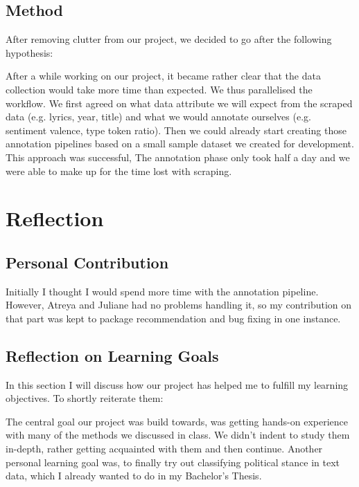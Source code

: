 \documentclass[11pt,a4paper]{article}
\begin{document}
\subsection{Method}

After removing clutter from our project, we decided to go after the following hypothesis:


After a while working on our project, it became rather clear that the data collection would take more time than expected. We thus parallelised the workflow. We first agreed on what data attribute we will expect from the scraped data (e.g. lyrics, year, title) and what we would annotate ourselves (e.g. sentiment valence, type token ratio). Then we could already start creating those annotation pipelines based on a small sample dataset we created for development. This approach was successful, The annotation phase only took half a day and we were able to make up for the time lost with scraping.  

\section{Reflection}

\subsection{Personal Contribution}

Initially I thought I would spend more time with the annotation pipeline. However, Atreya and Juliane had no problems handling it, so my contribution on that part was kept to package recommendation and bug fixing in one instance.

\subsection{Reflection on Learning Goals}
In this section I will discuss how our project has helped me to fulfill my learning objectives. To shortly reiterate them: 

The central goal our project was build towards, was getting hands-on experience with many of the methods we discussed in class. We didn't indent to study them in-depth, rather getting acquainted with them and then continue.
Another personal learning goal was, to finally try out classifying political stance in text data, which I already wanted to do in my Bachelor's Thesis.
\end{document}
